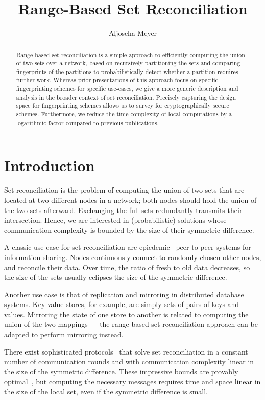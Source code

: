 \documentclass[conference]{IEEEtran}
\title{Range-Based Set Reconciliation}
\author{Aljoscha Meyer}
\begin{document}
\maketitle

\begin{abstract}
Range-based set reconciliation is a simple approach to efficiently computing the union of two sets over a network, based on recursively partitioning the sets and comparing fingerprints of the partitions to probabilistically detect whether a partition requires further work. Whereas prior presentations of this approach focus on specific fingerprinting schemes for specific use-cases, we give a more generic description and analysis in the broader context of set reconciliation. Precisely capturing the design space for fingerprinting schemes allows us to survey for cryptographically secure schemes. Furthermore, we reduce the time complexity of local computations by a logarithmic factor compared to previous publications.
\end{abstract}

\section{Introduction}\label{introduction}

Set reconciliation is the problem of computing the union of two sets that are located at two different nodes in a network; both nodes should hold the union of the two sets afterward. Exchanging the full sets redundantly transmits their intersection. Hence, we are interested in (probabilistic) solutions whose communication complexity is bounded by the size of their symmetric difference.

A classic use case for set reconciliation are epicdemic~\cite{demers1987epidemic} peer-to-peer systems for information sharing. Nodes continuously connect to randomly chosen other nodes, and reconcile their data. Over time, the ratio of fresh to old data decreases, so the size of the sets usually eclipses the size of the symmetric difference.

Another use case is that of replication and mirroring in distributed database systems. Key-value stores, for example, are simply sets of pairs of keys and values. Mirroring the state of one store to another is related to computing the union of the two mappings --- the range-based set reconciliation approach can be adapted to perform mirroring instead.

There exist sophisticated protocols~\cite{eppstein2011s} that solve set reconciliation in a constant number of communication rounds and with communication complexity linear in the size of the symmetric difference. These impressive bounds are provably optimal~\cite{minsky2003set}, but computing the necessary messages requires time and space linear in the size of the local set, even if the symmetric difference is small.
\end{document}
